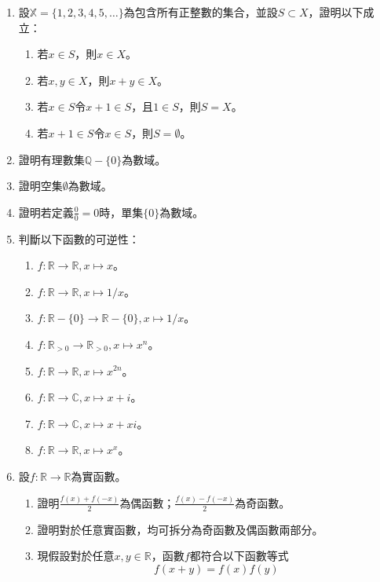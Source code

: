 \documentclass[12pt]{article}
\begin{document}
    \begin{enumerate}
        \item 設$\mathbb{X}=\{1,2,3,4,5,\dots\}$為包含所有正整數的集合，並設$S\subset X$，證明以下成立：\begin{enumerate}
            \item 若$x\in S$，則$x\in X$。
            \item 若$x,y\in X$，則$x+y\in X$。
            \item 若$x\in S$令$x+1\in S$，且$1\in S$，則$S=X$。
            \item 若$x+1\in S$令$x\in S$，則$S=\emptyset$。
        \end{enumerate}
        \item 證明有理數集$\mathbb{Q}-\{0\}$為數域。
        \item 證明空集$\emptyset$為數域。
        \item 證明若定義$\frac{0}{0}=0$時，單集$\{0\}$為數域。
        \item 判斷以下函數的可逆性：\begin{enumerate}
            \item $f:\mathbb{R}\to\mathbb{R}, x\mapsto x$。
            \item $f:\mathbb{R}\to\mathbb{R}, x\mapsto 1/x$。
            \item $f:\mathbb{R}-\{0\}\to\mathbb{R}-\{0\}, x\mapsto 1/x$。
            \item $f:\mathbb{R}_{>0}\to\mathbb{R}_{>0}, x\mapsto x^n$。
            \item $f:\mathbb{R}\to\mathbb{R}, x\mapsto x^{2n}$。
            \item $f:\mathbb{R}\to\mathbb{C}, x\mapsto x+i$。
            \item $f:\mathbb{R}\to\mathbb{C}, x\mapsto x+xi$。
            \item $f:\mathbb{R}\to\mathbb{R}, x\mapsto x^x$。
        \end{enumerate}
        \item 設$f:\mathbb{R}\to\mathbb{R}$為實函數。\begin{enumerate}
            \item 證明$\frac{f(x)+f(-x)}{2}$為偶函數；$\frac{f(x)-f(-x)}{2}$為奇函數。
            \item 證明對於任意實函數，均可拆分為奇函數及偶函數兩部分。
            \item 現假設對於任意$x,y\in\mathbb{R}$，函數$f$都符合以下函數等式$$f(x+y)=f(x)f(y)$$\begin{enumerate}

\end{enumerate}
\end{enumerate}
\end{enumerate}
\end{document}
